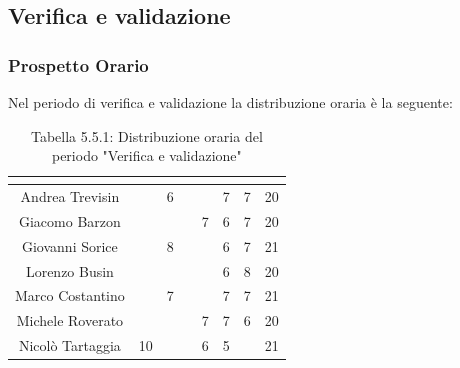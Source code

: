 \subsection{Verifica e validazione}

\subsubsection{Prospetto Orario}
Nel periodo di verifica e validazione la distribuzione oraria è la seguente:

\renewcommand{\arraystretch}{1.5}
\begin{table}[H]
\begin{center}
\begin{tabular}{|c|c|c|c|c|c|c|c|}
\hline
\rowcolor{title_row}
\textbf{\color{title_text}{Nome}} & \textbf{\color{title_text}{Resp.}} & \textbf{\color{title_text}{Ammi.}} & \textbf{\color{title_text}{Analist.}} & \textbf{\color{title_text}{Progett.}} & \textbf{\color{title_text}{Program.}} & \textbf{\color{title_text}{Verific.}} & \textbf{\color{title_text}{Totale}} \\ \hline
Andrea Trevisin  & & 6 & & & 7 & 7 & 20  \\ \hline
Giacomo Barzon   & & & & 7 & 6 & 7 & 20  \\ \hline
Giovanni Sorice  & & 8 & &  & 6 & 7 & 21  \\ \hline
Lorenzo Busin    & & & & & 6 & 8 & 20  \\ \hline
Marco Costantino & & 7 & & & 7 & 7 & 21  \\ \hline
Michele Roverato & & & & 7 & 7 & 6 & 20  \\ \hline
Nicolò Tartaggia & 10 & & & 6 & 5 & & 21  \\ \hline
\end{tabular}
\caption{Tabella 5.5.1: Distribuzione oraria del periodo "Verifica e validazione"\label{}}
\end{center}
\end{table}
\renewcommand{\arraystretch}{1}

